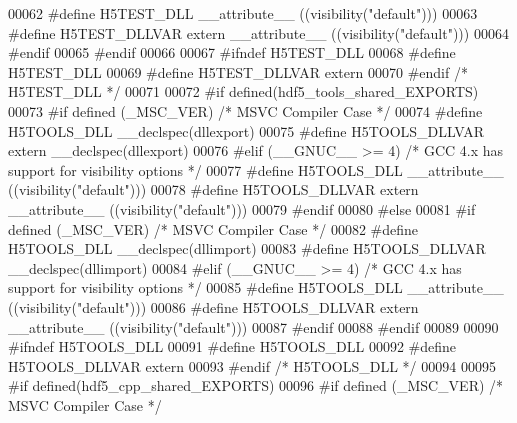 \begin{DoxyCode}
00062 \textcolor{preprocessor}{    #define H5TEST\_DLL \_\_attribute\_\_ ((visibility("default")))}
00063 \textcolor{preprocessor}{    #define H5TEST\_DLLVAR extern \_\_attribute\_\_ ((visibility("default")))}
00064 \textcolor{preprocessor}{  #endif}
00065 \textcolor{preprocessor}{#endif}
00066 
00067 \textcolor{preprocessor}{#ifndef H5TEST\_DLL}
00068 \textcolor{preprocessor}{  #define H5TEST\_DLL}
00069 \textcolor{preprocessor}{  #define H5TEST\_DLLVAR extern}
00070 \textcolor{preprocessor}{#endif }\textcolor{comment}{/* H5TEST\_DLL */}\textcolor{preprocessor}{}
00071 
00072 \textcolor{preprocessor}{#if defined(hdf5\_tools\_shared\_EXPORTS)}
00073 \textcolor{preprocessor}{  #if defined (\_MSC\_VER)  }\textcolor{comment}{/* MSVC Compiler Case */}\textcolor{preprocessor}{}
00074 \textcolor{preprocessor}{    #define H5TOOLS\_DLL \_\_declspec(dllexport)}
00075 \textcolor{preprocessor}{    #define H5TOOLS\_DLLVAR extern \_\_declspec(dllexport)}
00076 \textcolor{preprocessor}{  #elif (\_\_GNUC\_\_ >= 4)  }\textcolor{comment}{/* GCC 4.x has support for visibility options */}\textcolor{preprocessor}{}
00077 \textcolor{preprocessor}{    #define H5TOOLS\_DLL \_\_attribute\_\_ ((visibility("default")))}
00078 \textcolor{preprocessor}{    #define H5TOOLS\_DLLVAR extern \_\_attribute\_\_ ((visibility("default")))}
00079 \textcolor{preprocessor}{  #endif}
00080 \textcolor{preprocessor}{#else}
00081 \textcolor{preprocessor}{  #if defined (\_MSC\_VER)  }\textcolor{comment}{/* MSVC Compiler Case */}\textcolor{preprocessor}{}
00082 \textcolor{preprocessor}{    #define H5TOOLS\_DLL \_\_declspec(dllimport)}
00083 \textcolor{preprocessor}{    #define H5TOOLS\_DLLVAR \_\_declspec(dllimport)}
00084 \textcolor{preprocessor}{  #elif (\_\_GNUC\_\_ >= 4)  }\textcolor{comment}{/* GCC 4.x has support for visibility options */}\textcolor{preprocessor}{}
00085 \textcolor{preprocessor}{    #define H5TOOLS\_DLL \_\_attribute\_\_ ((visibility("default")))}
00086 \textcolor{preprocessor}{    #define H5TOOLS\_DLLVAR extern \_\_attribute\_\_ ((visibility("default")))}
00087 \textcolor{preprocessor}{  #endif}
00088 \textcolor{preprocessor}{#endif}
00089 
00090 \textcolor{preprocessor}{#ifndef H5TOOLS\_DLL}
00091 \textcolor{preprocessor}{  #define H5TOOLS\_DLL}
00092 \textcolor{preprocessor}{  #define H5TOOLS\_DLLVAR extern}
00093 \textcolor{preprocessor}{#endif }\textcolor{comment}{/* H5TOOLS\_DLL */}\textcolor{preprocessor}{}
00094 
00095 \textcolor{preprocessor}{#if defined(hdf5\_cpp\_shared\_EXPORTS)}
00096 \textcolor{preprocessor}{  #if defined (\_MSC\_VER)  }\textcolor{comment}{/* MSVC Compiler Case */}\textcolor{preprocessor}{}

\end{DoxyCode}
